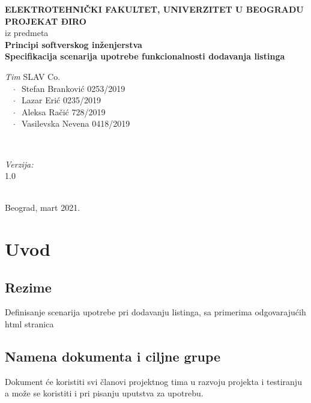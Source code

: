 \documentclass[12pt]{article}
\begin{document}
    \renewcommand{\labelenumii}{\arabic{enumi}.\arabic{enumii}}
	\begin{titlepage}  
		\center
		\textbf{ \LARGE ELEKTROTEHNIČKI FAKULTET, UNIVERZITET U BEOGRADU } \\[4cm]
		\textbf{ \Large PROJEKAT ĐIRO\texttrademark} \\[0.3cm]
		iz predmeta \\[0.3cm]
		\textbf{ \Large Principi softverskog inženjerstva} \\[0.7cm]
		{ \huge \bfseries Specifikacija scenarija upotrebe funkcionalnosti dodavanja listinga } \\[6cm]
		

		\begin{minipage}{0.5\textwidth}
			\begin{flushleft}
				\large
				\emph{Tim} SLAV Co. \\
			     $\;\;\; \cdot \;\;$Stefan Branković  0253/2019\\
			     $\;\;\; \cdot \;\;$Lazar Erić 0235/2019\\
			     $\;\;\; \cdot \;\;$Aleksa Račić 728/2019\\
			     $\;\;\; \cdot \;\;$Vasilevska Nevena 0418/2019
			\end{flushleft}
		\end{minipage}
		~
		\begin{minipage}{0.4\textwidth}
			\begin{flushright}
				\large
				\emph{Verzija:} \\
				1.0
			\end{flushright}
		\end{minipage} \\[2cm]
		\enlargethispage{4\baselineskip}
		{ \large Beograd, mart 2021. }
		\vfill
	\end{titlepage}
\pagebreak
\tableofcontents
\pagebreak



\section{Uvod}
\subsection{Rezime}
Definisanje scenarija upotrebe pri dodavanju listinga, sa primerima odgovarajućih html stranica
\subsection{Namena dokumenta i ciljne grupe}
Dokument će koristiti svi članovi projektnog tima u razvoju projekta i testiranju a može se koristiti i pri pisanju uputstva za
upotrebu.
\end{document}
